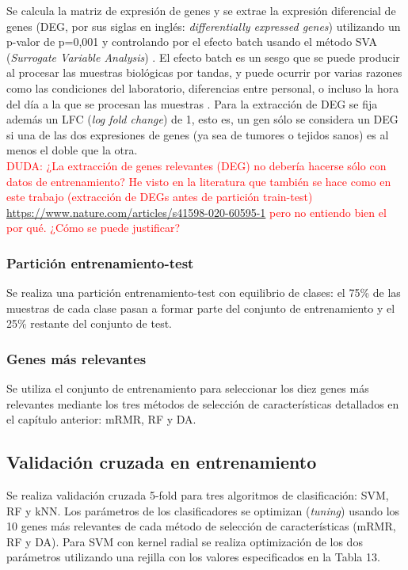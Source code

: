 Se calcula la matriz de expresión de genes y se extrae la expresión diferencial de genes (DEG, por sus siglas en inglés: \textit{differentially expressed genes}) utilizando un p-valor de p=0,001 y controlando por el efecto batch usando el método SVA (\textit{Surrogate Variable Analysis}) \cite{Leek2012}. El efecto batch es un sesgo que se puede producir al procesar las muestras biológicas por tandas, y puede ocurrir por varias razones como las condiciones del laboratorio, diferencias entre personal, o incluso la hora del día a la que se procesan las muestras \cite{Goh2017, Leek2010}. Para la extracción de DEG se fija además un LFC (\textit{log fold change}) de 1, esto es, un gen sólo se considera un DEG si una de las dos expresiones de genes (ya sea de tumores o tejidos sanos) es al menos el doble que la otra.\\

\textcolor{red}{DUDA: ¿La extracción de genes relevantes (DEG) no debería hacerse sólo con datos de entrenamiento? He visto en la literatura que también se hace como en este trabajo (extracción de DEGs antes de partición train-test) \url{https://www.nature.com/articles/s41598-020-60595-1} pero no entiendo bien el por qué. ¿Cómo se puede justificar?}\\

\subsubsection{Partición entrenamiento-test}

Se realiza una partición entrenamiento-test con equilibrio de clases: el 75\% de las muestras de cada clase pasan a formar parte del conjunto de entrenamiento y el 25\% restante del conjunto de test.

\subsubsection{Genes más relevantes}

Se utiliza el conjunto de entrenamiento para seleccionar los diez genes más relevantes mediante los tres métodos de selección de características detallados en el capítulo anterior: mRMR, RF y DA.

\subsection{Validación cruzada en entrenamiento}

Se realiza validación cruzada 5-fold para tres algoritmos de clasificación: SVM, RF y kNN. Los parámetros de los clasificadores se optimizan (\textit{tuning}) usando los 10 genes más relevantes de cada método de selección de características (mRMR, RF y DA). Para SVM con kernel radial se realiza optimización de los dos parámetros utilizando una rejilla con los valores especificados en la Tabla 13.\\

